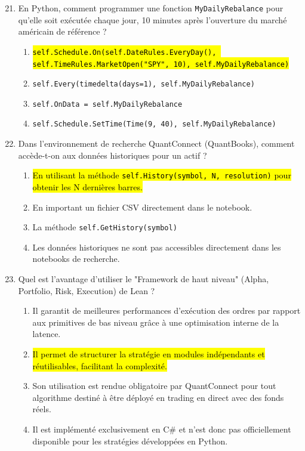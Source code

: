 \documentclass[a4paper,12pt]{article}
\begin{document}
\begin{enumerate}
    \setcounter{enumi}{20}
    \item En Python, comment programmer une fonction \texttt{MyDailyRebalance} pour qu'elle soit exécutée chaque jour, 10 minutes après l'ouverture du marché américain de référence ?
    \begin{enumerate}[label=(\Alph*)]
        \item \hl{\texttt{self.Schedule.On(self.DateRules.EveryDay(), self.TimeRules.MarketOpen("SPY", 10), self.MyDailyRebalance)}}
        \item \texttt{self.Every(timedelta(days=1), self.MyDailyRebalance)}
        \item \texttt{self.OnData = self.MyDailyRebalance}
        \item \texttt{self.Schedule.SetTime(Time(9, 40), self.MyDailyRebalance)}
    \end{enumerate}

    \item Dans l'environnement de recherche QuantConnect (QuantBooks), comment accède-t-on aux données historiques pour un actif ?
    \begin{enumerate}[label=(\Alph*)]
        \item \hl{En utilisant la méthode \texttt{self.History(symbol, N, resolution)} pour obtenir les N dernières barres.}
        \item En important un fichier CSV directement dans le notebook.
        \item La méthode \texttt{self.GetHistory(symbol)}
        \item Les données historiques ne sont pas accessibles directement dans les notebooks de recherche.
    \end{enumerate}

    \item Quel est l'avantage d'utiliser le "Framework de haut niveau" (Alpha, Portfolio, Risk, Execution) de Lean ?
    \begin{enumerate}[label=(\Alph*)]
        \item Il garantit de meilleures performances d'exécution des ordres par rapport aux primitives de bas niveau grâce à une optimisation interne de la latence.
        \item \hl{Il permet de structurer la stratégie en modules indépendants et réutilisables, facilitant la complexité.}
        \item Son utilisation est rendue obligatoire par QuantConnect pour tout algorithme destiné à être déployé en trading en direct avec des fonds réels.
        \item Il est implémenté exclusivement en C\# et n'est donc pas officiellement disponible pour les stratégies développées en Python.
    \end{enumerate}


\end{enumerate}
\end{document}

